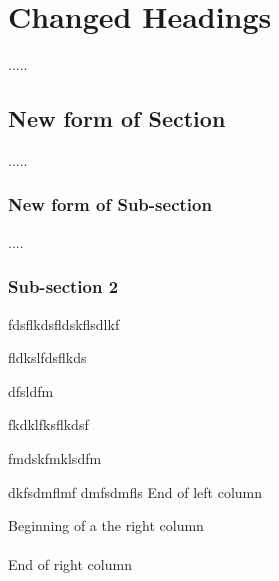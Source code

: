 \documentclass[twocolumn]{book}
\begin{document}
	\chapter{Changed Headings}
	.....
	\section{New form of Section}
	.....
	\subsection{New form of Sub-section}
	....
	\subsection{Sub-section 2}
	\vfill
	\Huge
	fdsflkdsfldskflsdlkf
	
	fldkslfdsflkds
	
	dfsldfm
	
	fkdklfksflkdsf
	
	fmdskfmklsdfm
	
	dkfsdmflmf
	dmfsdmfls
	End of left column
	
	Beginning of a the right column\\\\
	\vfill
	End of right column
	
	
\end{document}
